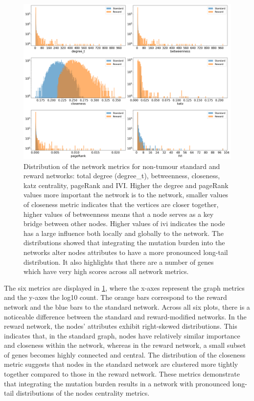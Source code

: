 \begin{figure}[!b]    
    \centering
    \includegraphics[width=1.0\textwidth,height=1.0\textheight,keepaspectratio]{Sections/Network_II/validation/net_metrics_Standard_Reward.png}
    \caption[Network metrics for non-tumour graphs]{Distribution of the network metrics for non-tumour standard and reward networks: total degree (degree\_t), betweenness, closeness, katz centrality, pageRank and IVI.  Higher the degree and pageRank values more important the network is to the network, smaller values of closeness metric indicates that the vertices are closer together, higher values of betweenness means that a node serves as a key bridge between other nodes. Higher values of \acrlong{ivi} indicates the node has a large influence both locally and globally to the network. The distributions showed that integrating the mutation burden into the networks alter nodes attributes to have a more pronounced long-tail distribution. It also highlights that there are a number of genes which have very high scores across  all network metrics.}
    \label{fig:N_II:net_metric_sig_std}
\end{figure}

The six metrics are displayed in \cref{fig:N_II:net_metric_sig_std}, where the x-axes represent the graph metrics and the y-axes the log10 count. The orange bars correspond to the reward network and the blue bars to the standard network. Across all six plots, there is a noticeable difference between the standard and reward-modified networks. In the reward network, the nodes' attributes exhibit right-skewed distributions. This indicates that, in the standard graph, nodes have relatively similar importance and closeness within the network, whereas in the reward network, a small subset of genes becomes highly connected and central. The distribution of the closeness metric suggests that nodes in the standard network are clustered more tightly together compared to those in the reward network. These metrics demonstrate that integrating the mutation burden results in a network with pronounced long-tail distributions of the nodes centrality metrics.




